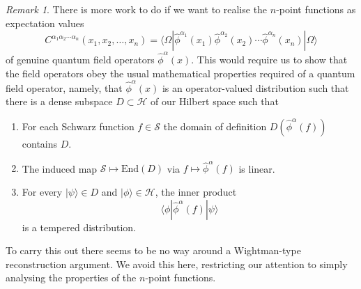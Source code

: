 \documentclass[11pt,oneside]{amsart}
\theoremstyle{plain}%
\theoremstyle{definition}
\theoremstyle{remark}
\newtheorem*{remark}{Remark}
\begin{document}
\begin{remark}
	There is more work to do if we want to realise the $n$-point functions as expectation values
\begin{equation}\label{eq:npointcorrfn}
C^{\alpha_1\alpha_2\cdots\alpha_n}(x_1, x_2, \ldots, x_n) = \langle \Omega|\hat{\phi}^{\alpha_1}(x_1)\hat{\phi}^{\alpha_2}(x_2)\cdots \hat{\phi}^{\alpha_n}(x_n)|\Omega\rangle
\end{equation}
of genuine quantum field operators $\hat{\phi}^{\alpha}(x)$. This would require us to show that the field operators obey the usual mathematical properties required of a quantum field operator, namely,
that $\hat{\phi}^{\alpha}(x)$ is an operator-valued distribution such that there is a dense subspace $D\subset \mathcal{H}$ of our Hilbert space such that
\begin{enumerate}
	\item For each Schwarz function $f\in\mathcal{S}$ the domain of definition $D(\hat{\phi}^{\alpha}(f))$ contains $D$.
	\item The induced map $\mathcal{S}\mapsto \text{End}(D)$ via $f\mapsto \hat{\phi}^{\alpha}(f)$ is linear.
	\item For every $|\psi\rangle \in D$ and $|\phi\rangle \in \mathcal{H}$, the inner product
	\begin{equation}
		\langle \phi|\hat{\phi}^{\alpha}(f)|\psi\rangle
	\end{equation}
	is a tempered distribution.
\end{enumerate}
To carry this out there seems to be no way around a Wightman-type reconstruction argument. We avoid this here, restricting our attention to simply analysing the properties of the $n$-point functions.
\end{remark}
\end{document}
